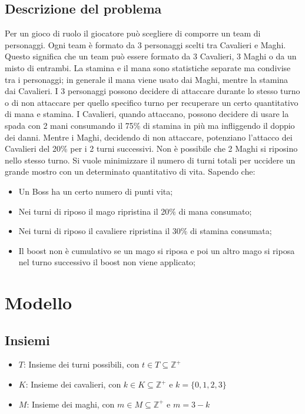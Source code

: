 \documentclass[12pt]{article}
\begin{document}
    \subsection{Descrizione del problema}
    Per un gioco di ruolo il giocatore può scegliere di comporre un team di personaggi.
    Ogni team è formato da 3 personaggi scelti tra Cavalieri e Maghi. Questo significa che un team può essere formato da 3 Cavalieri, 3 Maghi o da un misto di entrambi. 
    La stamina e il mana sono statistiche separate ma condivise tra i personaggi; in generale
    il mana viene usato dai Maghi, mentre la stamina dai Cavalieri.
    I 3 personaggi possono decidere di attaccare durante lo stesso turno o di non attaccare per quello specifico turno per recuperare un certo quantitativo di mana e stamina.
    I Cavalieri, quando attaccano, possono decidere di usare la spada con 2 mani consumando il 75\% di stamina in più ma infliggendo il doppio dei danni. Mentre i Maghi, decidendo di non attaccare, potenziano l'attacco dei Cavalieri del 20\% per i 2 turni successivi. Non è possibile che 2 Maghi si riposino nello stesso turno. Si vuole minimizzare il numero di turni totali per uccidere un grande mostro con un determinato quantitativo di vita. Sapendo che:
    \begin{itemize}
        \item Un Boss ha un certo numero di punti vita;
        \item Nei turni di riposo il mago ripristina il 20$\%$ di mana consumato;
        \item Nei turni di riposo il cavaliere ripristina il 30$\%$ di stamina consumata;
        \item Il boost non è cumulativo se un mago si riposa e poi un altro mago si riposa nel turno successivo il boost non viene applicato;
    \end{itemize}

    \section{Modello}
    \subsection{Insiemi}
    \begin{itemize}
        \item $T$: Insieme dei turni possibili, con $t \in T \subseteq \mathbb{Z}^+$
        \item $K$: Insieme dei cavalieri, con $k \in K \subseteq \mathbb{Z}^+$ e $k = \{ 0,1,2,3 \}$
        \item $M$: Insieme dei maghi, con $m \in M \subseteq \mathbb{Z}^+$ e $m = 3- k$
    \end{itemize}
\end{document}
